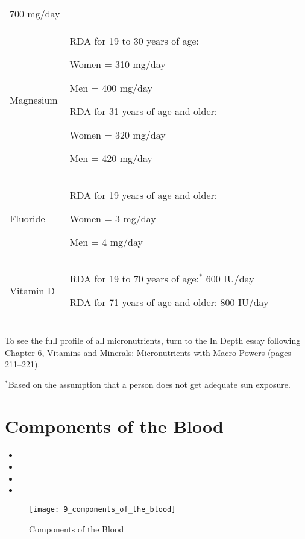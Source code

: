 \documentclass[title={Chapter 9}]{fdsn201notes}
\begin{document}
\begin{table}[H]
\begin{threeparttable}
\begin{tabular}{p{} p{}}
			700 mg/day\\
			Magnesium & RDA for 19 to 30 years of age:

			Women = 310 mg/day

			Men = 400 mg/day

			RDA for 31 years of age and older:

			Women = 320 mg/day

			Men = 420 mg/day\\
			Fluoride & RDA for 19 years of age and older:

			Women = 3 mg/day

			Men = 4 mg/day\\
			Vitamin D & RDA for 19 to 70 years of age:$^{*}$ 600 IU/day

			RDA for 71 years of age and older: 800 IU/day\\
			\rowcolor{rowdarkgreen} & \\
		\end{tabular}
		\begin{tablenotes}
			\small
			\item To see the full profile of all micronutrients, turn to the In Depth essay following Chapter 6, Vitamins and Minerals: Micronutrients with Macro Powers (pages 211--221).

			$^{*}$Based on the assumption that a person does not get adequate sun exposure.
		\end{tablenotes}
	\end{threeparttable}
\end{table}

\section{Components of the Blood}\label{sec:Components of the Blood}
\begin{itemize}
	\item {}
	\item {}
	\item {}
	\item {}
\end{itemize}

\begin{figure}[H]
	\centering
	\texttt{[image: 9\_components\_of\_the\_blood]}
	\caption{Components of the Blood}
	\label{fig:components-of-the-blood}
\end{figure}
\end{document}

